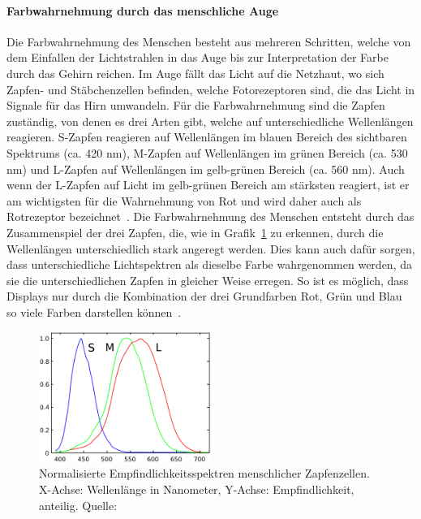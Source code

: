 \documentclass[12pt, a4paper, ngerman]{article}
\begin{document}
\paragraph{Farbwahrnehmung durch das menschliche Auge}
Die Farbwahrnehmung des Menschen besteht aus mehreren Schritten, 
welche von dem Einfallen der Lichtstrahlen in das Auge bis zur Interpretation der Farbe durch das Gehirn reichen.
Im Auge fällt das Licht auf die Netzhaut, wo sich Zapfen- und Stäbchenzellen befinden, 
welche Fotorezeptoren sind, die das Licht in Signale für das Hirn umwandeln.
Für die Farbwahrnehmung sind die Zapfen zuständig, von denen es drei Arten gibt, welche auf unterschiedliche Wellenlängen reagieren.
S-Zapfen reagieren auf Wellenlängen im blauen Bereich des sichtbaren Spektrums (ca. 420 nm), 
M-Zapfen auf Wellenlängen im grünen Bereich (ca. 530 nm) und L-Zapfen auf Wellenlängen im gelb-grünen Bereich (ca. 560 nm).
Auch wenn der L-Zapfen auf Licht im gelb-grünen Bereich am stärksten reagiert, 
ist er am wichtigsten für die Wahrnehmung von Rot und wird daher auch als Rotrezeptor bezeichnet~\cite{Zapfen_Auge_2023}.
Die Farbwahrnehmung des Menschen entsteht durch das Zusammenspiel der drei Zapfen, 
die, wie in Grafik~\ref{fig:LMS} zu erkennen, durch die Wellenlängen unterschiedlich stark angeregt werden. 
Dies kann auch dafür sorgen, dass unterschiedliche Lichtspektren als dieselbe Farbe wahrgenommen werden, 
da sie die unterschiedlichen Zapfen in gleicher Weise erregen. 
So ist es möglich, dass Displays nur durch die Kombination der drei Grundfarben Rot, Grün und Blau 
so viele Farben darstellen können~\cite{Ottosson_2020}.

\begin{figure}
  \centering
  \includegraphics[width=0.5\textwidth]{Grafiken/LMS.png}
  \caption{Normalisierte Empfindlichkeitsspektren menschlicher Zapfenzellen. X-Achse: Wellenlänge in Nanometer, Y-Achse: Empfindlichkeit, anteilig. Quelle: \cite{LMS_color_space_2023}}
  \label{fig:LMS}
\end{figure}
\end{document}
